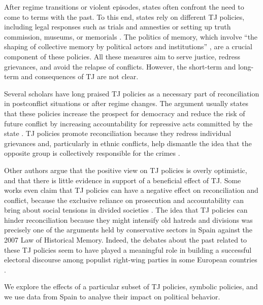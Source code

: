 \documentclass[12pt, notitlepage]{article}
\begin{document}
After regime transitions or violent episodes, states often confront the need to come to terms with the past.
To this end, states rely on different TJ policies, including legal responses such as trials and amnesties or setting up truth commission, museums, or memorials \citep{De-Brito:2001aa, Elster:2004aa, Balasco:2013aa}.
The politics of memory, which involve ``the shaping of collective memory by political actors and institutions'' \citep[][176]{Zubrzycki:2020aa}, are a crucial component of these policies.
All these measures aim to serve justice, redress grievances, and avoid the relapse of conflicts.
However, the short-term and long-term and consequences of TJ are not clear.

Several scholars have long praised TJ policies as a necessary part of reconciliation in postconflict situations or after regime changes.
The argument usually states that these policies increase the prospect for democracy \citep{Kritz:1995aa, Elster:2004aa, Sikkink:2007aa} and reduce the risk of future conflict by increasing accountability for repressive acts committed by the state \citep{Kim:2010aa, Meernik:2010aa}.
TJ policies promote reconciliation because they redress individual grievances and, particularly in ethnic conflicts, help dismantle the idea that the opposite group is collectively responsible for the crimes \citep{Scharf:1997aa, Akhavan:1998aa, Hayner:2001aa}.

Other authors argue that the positive view on TJ policies is overly optimistic, and that there is little evidence in support of a beneficial effect of TJ\citep{Mendeloff:2004aa, Thoms:2010aa, Daly:2011aa}.
Some works even claim that TJ policies can have a negative effect on reconciliation and conflict, because the exclusive reliance on prosecution and accountability can bring about social tensions in divided societies \citep{Goldsmith:2003aa, Snyder:2004aa}.
The idea that TJ policies can hinder reconciliation because they might intensify old hatreds and divisions was precisely one of the arguments held by conservative sectors in Spain against the 2007 Law of Historical Memory. Indeed, the debates about the past related to these TJ policies seem to have played a meaningful role in building a successful electoral discourse among populist right-wing parties in some European countries \citep{Martin:2020aa}.

We explore the effects of a particular subset of TJ policies, symbolic policies, and we use data from Spain to analyse their impact on political behavior.
\end{document}
